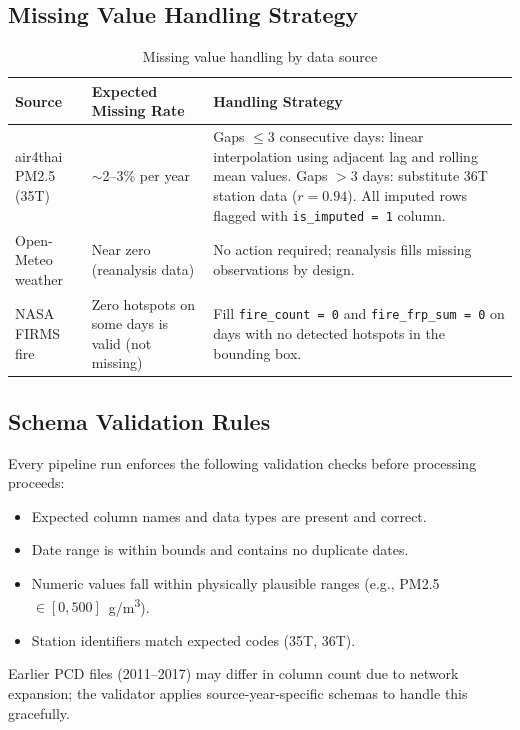 \documentclass[12pt,a4paper]{report}
\begin{document}
\subsection{Missing Value Handling Strategy}

\begin{table}[H]
\centering
\caption{Missing value handling by data source}
\label{tab:missing_values}
\begin{tabularx}{\textwidth}{@{}p{3cm}p{3.5cm}X@{}}
\toprule
\textbf{Source} & \textbf{Expected Missing Rate} & \textbf{Handling Strategy} \\
\midrule
air4thai PM2.5 (35T) &
  $\sim$2--3\% per year &
  Gaps $\leq$3 consecutive days: linear interpolation using adjacent lag and rolling mean values. Gaps $>$3 days: substitute 36T station data ($r = 0.94$). All imputed rows flagged with \texttt{is\_imputed = 1} column. \\[6pt]
Open-Meteo weather &
  Near zero (reanalysis data) &
  No action required; reanalysis fills missing observations by design. \\[6pt]
NASA FIRMS fire &
  Zero hotspots on some days is valid (not missing) &
  Fill \texttt{fire\_count = 0} and \texttt{fire\_frp\_sum = 0} on days with no detected hotspots in the bounding box. \\
\bottomrule
\end{tabularx}
\end{table}

\subsection{Schema Validation Rules}

Every pipeline run enforces the following validation checks before processing proceeds:
\begin{itemize}
  \item Expected column names and data types are present and correct.
  \item Date range is within bounds and contains no duplicate dates.
  \item Numeric values fall within physically plausible ranges (e.g., PM2.5 $\in [0, 500]$~\textmu g/m\textsuperscript{3}).
  \item Station identifiers match expected codes (35T, 36T).
\end{itemize}
Earlier PCD files (2011--2017) may differ in column count due to network expansion; the validator applies source-year-specific schemas to handle this gracefully.
\end{document}
